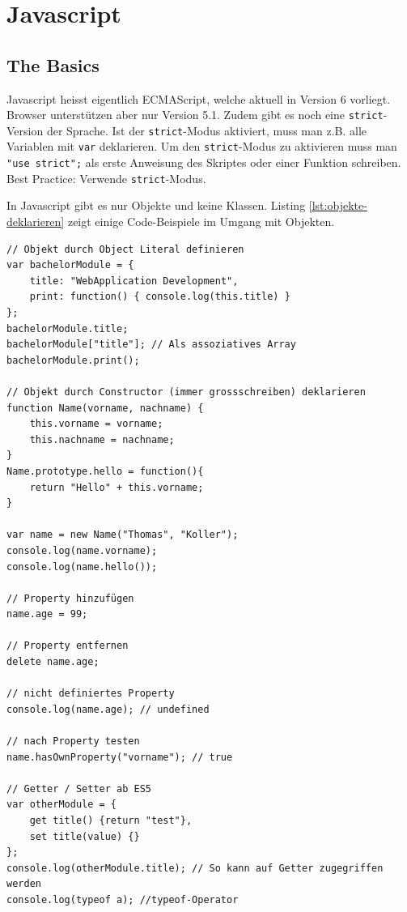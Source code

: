 \chapter{Javascript}

\section{The Basics}

Javascript heisst eigentlich ECMAScript, welche aktuell in Version 6 vorliegt. Browser unterstützen aber nur Version 5.1. Zudem gibt es noch eine \lstinline|strict|-Version der Sprache. Ist der \lstinline|strict|-Modus aktiviert, muss man z.B. alle Variablen mit \lstinline|var| deklarieren. Um den \lstinline|strict|-Modus zu aktivieren muss man \lstinline|"use strict";| als erste Anweisung des Skriptes oder einer Funktion schreiben. Best Practice: Verwende  \lstinline|strict|-Modus. 

In Javascript gibt es nur Objekte und keine Klassen. Listing \ref{lst:objekte-deklarieren} zeigt einige Code-Beispiele im Umgang mit Objekten.

\begin{lstlisting}[label=lst:objekte-deklarieren,caption=Objekte deklarieren]
// Objekt durch Object Literal definieren
var bachelorModule = {
	title: "WebApplication Development",
	print: function() { console.log(this.title) }
};
bachelorModule.title;
bachelorModule["title"]; // Als assoziatives Array
bachelorModule.print();

// Objekt durch Constructor (immer grossschreiben) deklarieren
function Name(vorname, nachname) {
	this.vorname = vorname;
	this.nachname = nachname;
}
Name.prototype.hello = function(){
	return "Hello" + this.vorname;
}

var name = new Name("Thomas", "Koller");
console.log(name.vorname);
console.log(name.hello());

// Property hinzufügen
name.age = 99;

// Property entfernen
delete name.age;

// nicht definiertes Property
console.log(name.age); // undefined

// nach Property testen
name.hasOwnProperty("vorname"); // true

// Getter / Setter ab ES5
var otherModule = {
	get title() {return "test"},
	set title(value) {}
};
console.log(otherModule.title); // So kann auf Getter zugegriffen werden
console.log(typeof a); //typeof-Operator
\end{lstlisting}

